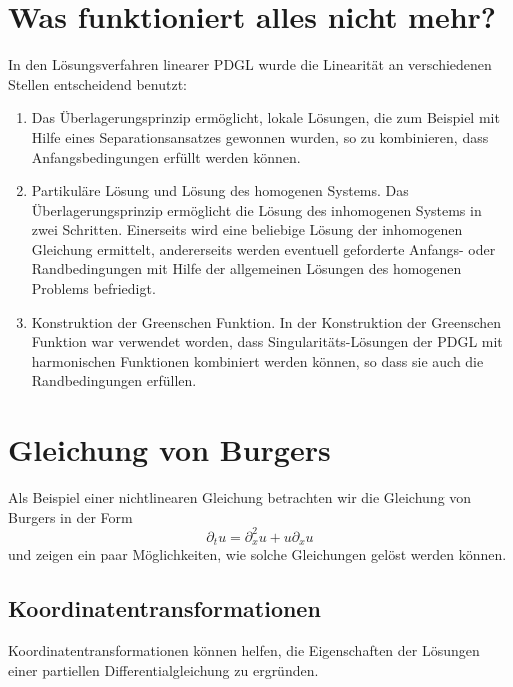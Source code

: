 \section{Was funktioniert alles nicht mehr?}
In den Lösungsverfahren linearer PDGL wurde die Linearität an verschiedenen
Stellen entscheidend benutzt:
\begin{enumerate}
\item
Das Überlagerungsprinzip ermöglicht, lokale Lösungen, die zum Beispiel
mit Hilfe eines Separationsansatzes gewonnen wurden, so zu kombinieren, dass
Anfangsbedingungen erfüllt werden können.
\item
Partikuläre Lösung und Lösung des homogenen Systems.
Das Überlagerungsprinzip ermöglicht die Lösung des inhomogenen Systems
in zwei Schritten. Einerseits wird eine beliebige Lösung der inhomogenen
Gleichung ermittelt, andererseits werden eventuell geforderte Anfangs-
oder Randbedingungen mit Hilfe der allgemeinen Lösungen des homogenen
Problems befriedigt.
\item
Konstruktion der Greenschen Funktion. In der Konstruktion der
Greenschen Funktion war verwendet worden, dass Singularitäts-Lösungen 
der PDGL mit harmonischen Funktionen kombiniert werden können, so 
dass sie auch die Randbedingungen erfüllen.
\end{enumerate}

\section{Gleichung von Burgers\label{burgers}}
Als Beispiel einer nichtlinearen Gleichung betrachten wir die Gleichung
von Burgers in der Form
\[
\partial_t u=\partial_x^2u+u\partial_xu
\]
und zeigen ein paar Möglichkeiten, wie solche Gleichungen
gelöst werden können.

\subsection{Koordinatentransformationen}
Koordinatentransformationen können helfen, die Eigenschaften der
Lösungen einer partiellen Differentialgleichung zu ergründen.


